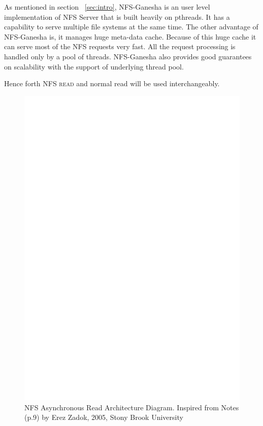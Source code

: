    As mentioned in section ~\ref{sec:intro}, NFS-Ganesha is an user level implementation of NFS Server that is built heavily on pthreads. It has a capability to serve multiple file systems at the same time. The other advantage of NFS-Ganesha is, it manages huge meta-data cache. Because of this huge cache it can serve most of the NFS requests very fast. All the request processing is handled only by a pool of threads. NFS-Ganesha also provides good guarantees on scalability with the support of underlying thread pool. 
   
  Hence forth \textsc{NFS read} and normal read will be used interchangeably.    

\begin{figure}
\centering
\includegraphics[scale=0.7]{figures/AsyncRead.eps}
\caption{NFS Asynchronous Read Architecture Diagram. Inspired from Notes \cite{NFSv4}(p.9) by Erez Zadok, 2005, Stony Brook University}
\label{fig:NFSAsyncReadArch}
\end{figure}



